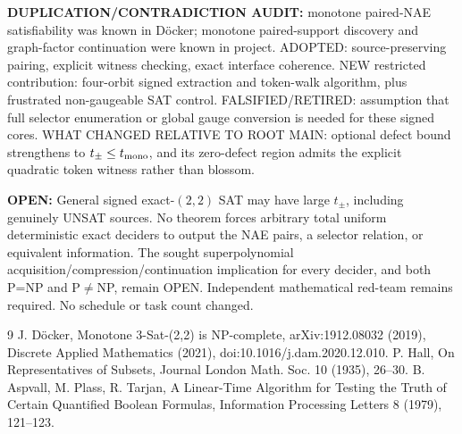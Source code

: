 \documentclass[11pt]{article}
\begin{document}
\textbf{DUPLICATION/CONTRADICTION AUDIT:} monotone paired-NAE satisfiability was known in D\"ocker; monotone paired-support discovery and graph-factor continuation were known in project. ADOPTED: source-preserving pairing, explicit witness checking, exact interface coherence. NEW restricted contribution: four-orbit signed extraction and token-walk algorithm, plus frustrated non-gaugeable SAT control. FALSIFIED/RETIRED: assumption that full selector enumeration or global gauge conversion is needed for these signed cores. WHAT CHANGED RELATIVE TO ROOT MAIN: optional defect bound strengthens to $t_\pm\le t_{\rm mono}$, and its zero-defect region admits the explicit quadratic token witness rather than blossom.

\textbf{OPEN:} General signed exact-$(2,2)$ SAT may have large $t_\pm$, including genuinely UNSAT sources. No theorem forces arbitrary total uniform deterministic exact deciders to output the NAE pairs, a selector relation, or equivalent information. The sought superpolynomial acquisition/compression/continuation implication for every decider, and both P=NP and P$\ne$NP, remain OPEN. Independent mathematical red-team remains required. No schedule or task count changed.

\begin{thebibliography}{9}
 J. D\"ocker, Monotone 3-Sat-(2,2) is NP-complete, arXiv:1912.08032 (2019), Discrete Applied Mathematics (2021), doi:10.1016/j.dam.2020.12.010.
 P. Hall, On Representatives of Subsets, Journal London Math. Soc. 10 (1935), 26--30.
 B. Aspvall, M. Plass, R. Tarjan, A Linear-Time Algorithm for Testing the Truth of Certain Quantified Boolean Formulas, Information Processing Letters 8 (1979), 121--123.
\end{thebibliography}
\end{document}
